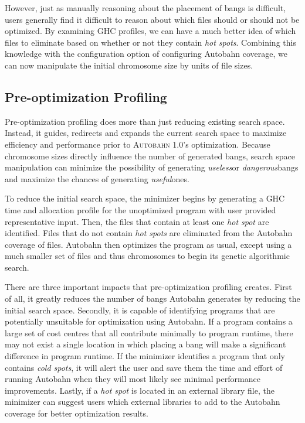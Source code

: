 \documentclass[format=sigplan]{acmart}
\newcommand{\hotspot}[0]{\textit{hot spot}}
\newcommand{\hotspots}[0]{\textit{hot spots}}
\newcommand{\coldspots}[0]{\textit{cold spots}}
\newcommand{\dangerous}[0]{\textit{dangerous}}
\newcommand{\useful}[0]{\textit{useful}}
\newcommand{\useless}[0]{\textit{useless}}
\newcommand{\Ao}[0]{\textsc{Autobahn 1.0}}
\newcommand{\preopt}[0]{pre-optimization}
\newcommand{\Preopt}[0]{Pre-optimization}
\begin{document}
However, just as manually reasoning about the placement of bangs is difficult, users generally find it difficult to reason about which files should or should not be optimized. By examining GHC profiles, we can have a much better idea of which files to eliminate based on whether or not they contain \hotspots{}. Combining this knowledge with the configuration option of configuring Autobahn coverage, we can now manipulate the initial chromosome size by units of file sizes. 

\subsection{\Preopt{} Profiling}

\Preopt{} profiling does more than just reducing existing search space. Instead, it guides, redirects and expands the current search space to maximize efficiency and performance prior to \Ao{}'s optimization. Because chromosome sizes directly influence the number of generated bangs, search space manipulation can minimize the possibility of generating \useless or \dangerous bangs and maximize the chances of generating \useful ones.

To reduce the initial search space, the minimizer begins by generating a GHC time and allocation profile for the unoptimized program with user provided representative input. Then, the files that contain at least one \hotspot{} are identified. Files that do not contain \hotspots{} are eliminated from the Autobahn coverage of files. Autobahn then optimizes the program as usual, except using a much smaller set of files and thus chromosomes to begin its genetic algorithmic search. 

There are three important impacts that \preopt{} profiling creates. First of all, it greatly reduces the number of bangs Autobahn generates by reducing the initial search space. Secondly, it is capable of identifying programs that are potentially unsuitable for optimization using Autobahn. If a program contains a large set of cost centres that all contribute minimally to program runtime, there may not exist a single location in which placing a bang will make a significant difference in program runtime. If the minimizer identifies a program that only contains \coldspots{}, it will alert the user and save them the time and effort of running Autobahn when they will most likely see minimal performance improvements. Lastly, if a \hotspot{} is located in an external library file, the minimizer can suggest users which external libraries to add to the Autobahn coverage for better optimization results.
\end{document}
